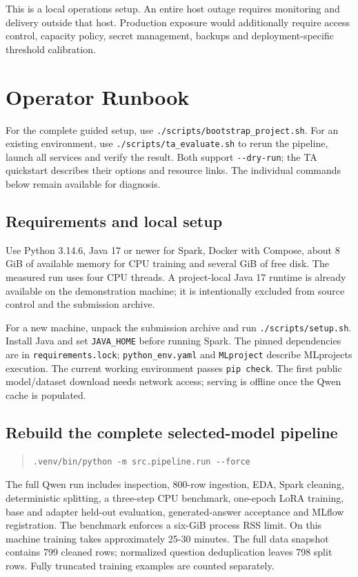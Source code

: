 \documentclass[11pt,a4paper]{article}
\begin{document}
This is a local operations setup. An entire host outage requires monitoring and delivery outside that host. Production exposure would additionally require access control, capacity policy, secret management, backups and deployment-specific threshold calibration.

\clearpage
\section*{Operator Runbook}
For the complete guided setup, use \texttt{.\allowbreak{}/\allowbreak{}scripts/\allowbreak{}bootstrap\_\allowbreak{}project.\allowbreak{}sh}. For an existing environment, use \texttt{.\allowbreak{}/\allowbreak{}scripts/\allowbreak{}ta\_\allowbreak{}evaluate.\allowbreak{}sh} to rerun the pipeline, launch all services and verify the result. Both support \texttt{-\allowbreak{}-\allowbreak{}dry-\allowbreak{}run}; the TA quickstart describes their options and resource links. The individual commands below remain available for diagnosis.

\subsection*{Requirements and local setup}
Use Python 3.14.6, Java 17 or newer for Spark, Docker with Compose, about 8 GiB of available memory for CPU training and several GiB of free disk. The measured run uses four CPU threads. A project-local Java 17 runtime is already available on the demonstration machine; it is intentionally excluded from source control and the submission archive.

For a new machine, unpack the submission archive and run \texttt{.\allowbreak{}/\allowbreak{}scripts/\allowbreak{}setup.\allowbreak{}sh}. Install Java and set \texttt{JAVA\_\allowbreak{}HOME} before running Spark. The pinned dependencies are in \texttt{requirements.\allowbreak{}lock}; \texttt{python\_\allowbreak{}env.\allowbreak{}yaml} and \texttt{MLproject} describe MLprojects execution. The current working environment passes \texttt{pip check}. The first public model/dataset download needs network access; serving is offline once the Qwen cache is populated.

\subsection*{Rebuild the complete selected-model pipeline}
\begin{quote}\small
\begin{verbatim}
.venv/bin/python -m src.pipeline.run --force
\end{verbatim}
\end{quote}
The full Qwen run includes inspection, 800-row ingestion, EDA, Spark cleaning, deterministic splitting, a three-step CPU benchmark, one-epoch LoRA training, base and adapter held-out evaluation, generated-answer acceptance and MLflow registration. The benchmark enforces a six-GiB process RSS limit. On this machine training takes approximately 25-30 minutes. The full data snapshot contains 799 cleaned rows; normalized question deduplication leaves 798 split rows. Fully truncated training examples are counted separately.
\end{document}
